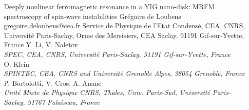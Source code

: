 \begin{conf-abstract}[]
{Deeply nonlinear ferromagnetic resonance in a YIG nano-disk:  MRFM spectroscopy of spin-wave instabilities}
{\color{blue} Grégoire de Loubens}
{gregoire.deloubens@cea.fr}
{Service de Physique de l'Etat Condensé, CEA, CNRS, Université Paris-Saclay, Orme des Mersisiers, CEA Saclay, 91191 Gif-sur-Yvette, France}
{{\color{blue}Y. Li, V. Naletov}\\ \textit{SPEC, CEA, CNRS, Université Paris-Saclay, 91191 Gif-sur-Yvette, France}\\ 
{\color{blue}O. Klein}\\ \textit{ SPINTEC, CEA, CNRS and Université Grenoble Alpes, 38054 Grenoble, France}\\ 
{\color{blue}P. Bortolotti, V. Cros, A. Anane}\\ \textit{Unité Mixte de Physique CNRS, Thales, Univ. Paris-Sud, Université Paris-Saclay, 91767 Palaiseau, France}\\ 
\decofourleft \decofourright}





\printbibliography[heading=none]

\end{conf-abstract}
